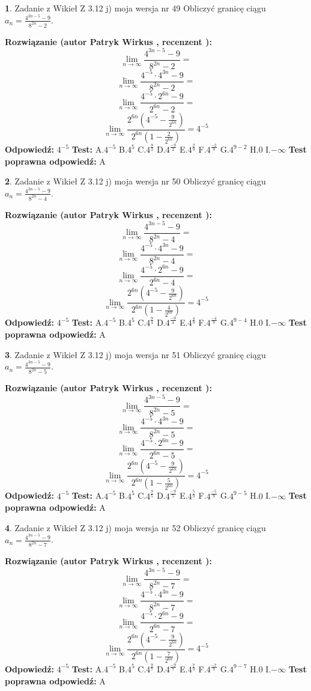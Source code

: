 \documentclass[12pt, a4paper]{article}
\theoremstyle{definition} %
\newtheorem{zad}{}
\newcommand{\zadStart}[1]{\begin{zad}#1\newline}
\newcommand{\zadStop}{\end{zad}}
\newcommand{\rozwStart}[2]{\noindent \textbf{Rozwiązanie (autor #1 , recenzent #2): }\newline}
\newcommand{\rozwStop}{\newline}
\newcommand{\odpStart}{\noindent \textbf{Odpowiedź:}\newline}
\newcommand{\odpStop}{\newline}
\newcommand{\testStart}{\noindent \textbf{Test:}\newline}
\newcommand{\testStop}{\newline}
\newcommand{\kluczStart}{\noindent \textbf{Test poprawna odpowiedź:}\newline}
\newcommand{\kluczStop}{\newline}
\begin{document}
\zadStart{Zadanie z Wikieł Z 3.12 j) moja wersja nr 49}
Obliczyć granicę ciągu $a_{n}=\frac{4^{3n-5}-9}{8^{2n}-2}$.
\zadStop
\rozwStart{Patryk Wirkus}{}
$$\lim\limits_{n\to\infty}\frac{4^{3n-5}-9}{8^{2n}-2}=$$
$$\lim\limits_{n\to\infty}\frac{4^{-5} \cdot 4^{3n}-9}{8^{2n}-2}=$$
$$\lim\limits_{n\to\infty}\frac{4^{-5} \cdot 2^{6n}-9}{2^{6n}-2}=$$
$$\lim\limits_{n\to\infty}\frac{2^{6n}(4^{-5} - \frac{9}{2^{6n}})}{2^{6n}(1-\frac{2}{2^{6n}})}= 4^{-5}$$
\rozwStop
\odpStart
$4^{-5}$
\odpStop
\testStart
A.$4^{-5}$
B.$4^{5}$
C.$4^{\frac{9}{2}}$
D.$4^{\frac{-9}{2}}$
E.$4^{\frac{2}{9}}$
F.$4^{\frac{-2}{9}}$
G.$4^{9-2}$
H.$0$
I.$-\infty$
\testStop
\kluczStart
A
\kluczStop



\zadStart{Zadanie z Wikieł Z 3.12 j) moja wersja nr 50}
Obliczyć granicę ciągu $a_{n}=\frac{4^{3n-5}-9}{8^{2n}-4}$.
\zadStop
\rozwStart{Patryk Wirkus}{}
$$\lim\limits_{n\to\infty}\frac{4^{3n-5}-9}{8^{2n}-4}=$$
$$\lim\limits_{n\to\infty}\frac{4^{-5} \cdot 4^{3n}-9}{8^{2n}-4}=$$
$$\lim\limits_{n\to\infty}\frac{4^{-5} \cdot 2^{6n}-9}{2^{6n}-4}=$$
$$\lim\limits_{n\to\infty}\frac{2^{6n}(4^{-5} - \frac{9}{2^{6n}})}{2^{6n}(1-\frac{4}{2^{6n}})}= 4^{-5}$$
\rozwStop
\odpStart
$4^{-5}$
\odpStop
\testStart
A.$4^{-5}$
B.$4^{5}$
C.$4^{\frac{9}{4}}$
D.$4^{\frac{-9}{4}}$
E.$4^{\frac{4}{9}}$
F.$4^{\frac{-4}{9}}$
G.$4^{9-4}$
H.$0$
I.$-\infty$
\testStop
\kluczStart
A
\kluczStop



\zadStart{Zadanie z Wikieł Z 3.12 j) moja wersja nr 51}
Obliczyć granicę ciągu $a_{n}=\frac{4^{3n-5}-9}{8^{2n}-5}$.
\zadStop
\rozwStart{Patryk Wirkus}{}
$$\lim\limits_{n\to\infty}\frac{4^{3n-5}-9}{8^{2n}-5}=$$
$$\lim\limits_{n\to\infty}\frac{4^{-5} \cdot 4^{3n}-9}{8^{2n}-5}=$$
$$\lim\limits_{n\to\infty}\frac{4^{-5} \cdot 2^{6n}-9}{2^{6n}-5}=$$
$$\lim\limits_{n\to\infty}\frac{2^{6n}(4^{-5} - \frac{9}{2^{6n}})}{2^{6n}(1-\frac{5}{2^{6n}})}= 4^{-5}$$
\rozwStop
\odpStart
$4^{-5}$
\odpStop
\testStart
A.$4^{-5}$
B.$4^{5}$
C.$4^{\frac{9}{5}}$
D.$4^{\frac{-9}{5}}$
E.$4^{\frac{5}{9}}$
F.$4^{\frac{-5}{9}}$
G.$4^{9-5}$
H.$0$
I.$-\infty$
\testStop
\kluczStart
A
\kluczStop



\zadStart{Zadanie z Wikieł Z 3.12 j) moja wersja nr 52}
Obliczyć granicę ciągu $a_{n}=\frac{4^{3n-5}-9}{8^{2n}-7}$.
\zadStop
\rozwStart{Patryk Wirkus}{}
$$\lim\limits_{n\to\infty}\frac{4^{3n-5}-9}{8^{2n}-7}=$$
$$\lim\limits_{n\to\infty}\frac{4^{-5} \cdot 4^{3n}-9}{8^{2n}-7}=$$
$$\lim\limits_{n\to\infty}\frac{4^{-5} \cdot 2^{6n}-9}{2^{6n}-7}=$$
$$\lim\limits_{n\to\infty}\frac{2^{6n}(4^{-5} - \frac{9}{2^{6n}})}{2^{6n}(1-\frac{7}{2^{6n}})}= 4^{-5}$$
\rozwStop
\odpStart
$4^{-5}$
\odpStop
\testStart
A.$4^{-5}$
B.$4^{5}$
C.$4^{\frac{9}{7}}$
D.$4^{\frac{-9}{7}}$
E.$4^{\frac{7}{9}}$
F.$4^{\frac{-7}{9}}$
G.$4^{9-7}$
H.$0$
I.$-\infty$
\testStop
\kluczStart
A
\kluczStop
\end{document}

